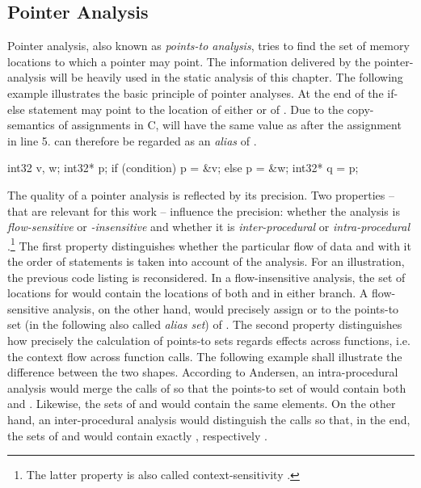 \subsection{Pointer Analysis}
Pointer analysis, also known as \textit{points-to analysis}, tries to find the set of memory locations to which a pointer may point\cite{PointerAnalysisForStructuredParallelPrograms}. The information delivered by the pointer-analysis will be heavily used in the static analysis of this chapter. The following example illustrates the basic principle of pointer analyses. At the end of the if-else statement  may point to the location of either  or of . Due to the copy-semantics of assignments in C,  will have the same value as  after the assignment in line 5.  can therefore be regarded as an \textit{alias} of .
\begin{ccode}
int32 v, w;
int32* p;
if (condition)  p = &v;
else            p = &w; 
int32* q = p;
\end{ccode}
The quality of a pointer analysis is reflected by its precision. Two properties -- that are relevant for this work -- influence the precision: whether the analysis is \textit{flow-sensitive} or \textit{-insensitive} and whether it is \textit{inter-procedural} or \textit{intra-procedural} \cite{ProgramAnalysisAndSpecialization}.\footnote{The latter property is also called context-sensitivity \cite{CloningBasedContextSensitive}.} The first property distinguishes whether the particular flow of data and with it the order of statements is taken into account of the analysis. For an illustration, the previous code listing is reconsidered. In a flow-insensitive analysis, the set of locations for  would contain the locations of both  and  in either branch. A flow-sensitive analysis, on the other hand, would precisely assign  or  to the points-to set (in the following also called \textit{alias set}) of . The second property distinguishes how precisely the calculation of points-to sets regards effects across functions, i.e. the context flow across function calls. The following example shall illustrate the difference between the two shapes. According to Andersen, an intra-procedural analysis would merge the calls of  so that the points-to set of  would contain both  and . Likewise, the sets of  and  would contain the same elements. On the other hand, an inter-procedural analysis would distinguish the calls so that, in the end, the sets of  and  would contain exactly , respectively .
